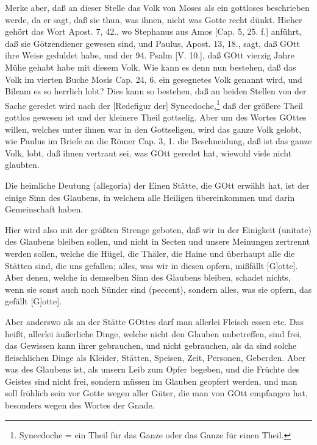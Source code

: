 Merke aber, daß an dieser Stelle das Volk von Moses als ein gottloses beschrieben werde, da er sagt, daß sie thun, was ihnen, nicht was Gotte recht dünkt. Hieher gehört das Wort Apost. 7, 42., wo Stephanus aus Amos [Cap. 5, 25. f.] anführt, daß sie Götzendiener gewesen sind, und Paulus, Apost. 13, 18., sagt, daß GOtt ihre Weise geduldet habe, und der 94. Psalm [V. 10.], daß GOtt vierzig Jahre Mühe gehabt habe mit diesem Volk. Wie kann es denn nun bestehen, daß das Volk im vierten Buche Mosis Cap. 24, 6. ein gesegnetes Volk genannt wird, und Bileam es so herrlich lobt? Dies kann so bestehen, daß an beiden Stellen von der Sache geredet wird nach der [Redefigur der] Synecdoche,\footnote{Synecdoche = ein Theil für das Ganze oder das Ganze für einen Theil.} daß der größere Theil gottlos gewesen ist und der kleinere Theil gottselig. Aber um des Wortes GOttes willen, welches unter ihnen war in den Gottseligen, wird das ganze Volk gelobt, wie Paulus im Briefe an die Römer Cap. 3, 1. die Beschneidung, daß ist das ganze Volk, lobt, daß ihnen vertraut sei, was GOtt geredet hat, wiewohl viele nicht glaubten.

Die heimliche Deutung (allegoria) der Einen Stätte, die GOtt erwählt hat, ist der einige Sinn des Glaubens, in welchem alle Heiligen übereinkommen und darin Gemeinschaft haben.

Hier wird also mit der größten Strenge geboten, daß wir in der Einigkeit (unitate) des Glaubens bleiben sollen, und nicht in Secten und unsere Meinungen zertrennt werden sollen, welche die Hügel, die Thäler, die Haine und überhaupt alle die Stätten sind, die uns gefallen; alles, was wir in diesen opfern, mißfällt [G]otte]. Aber denen, welche in demselben Sinn des Glaubens bleiben, schadet nichts, wenn sie sonst auch noch Sünder sind (peccent), sondern alles, was sie opfern, das gefällt [G]otte].

Aber anderswo als an der Stätte GOttes darf man allerlei Fleisch essen etc. Das heißt, allerlei äußerliche Dinge, welche nicht den Glauben unbetreffen, sind frei, das Gewissen kann ihrer gebrauchen, und nicht gebrauchen, als da sind solche fleischlichen Dinge als Kleider, Stätten, Speisen, Zeit, Personen, Geberden. Aber was des Glaubens ist, als unsern Leib zum Opfer begeben, und die Früchte des Geistes sind nicht frei, sondern müssen im Glauben geopfert werden, und man soll fröhlich sein vor Gotte wegen aller Güter, die man von GOtt empfangen hat, besonders wegen des Wortes der Gnade.

